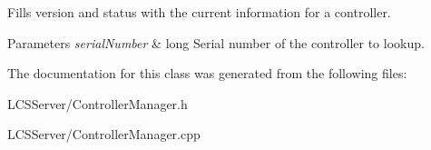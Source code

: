 Fills version and status with the current information for a controller. 
\begin{DoxyParams}{Parameters}
{\em serial\+Number} & long Serial number of the controller to lookup. \\
\hline
\end{DoxyParams}


The documentation for this class was generated from the following files\+:\begin{DoxyCompactItemize}
\item 
L\+C\+S\+Server/Controller\+Manager.\+h\item 
L\+C\+S\+Server/Controller\+Manager.\+cpp\end{DoxyCompactItemize}
